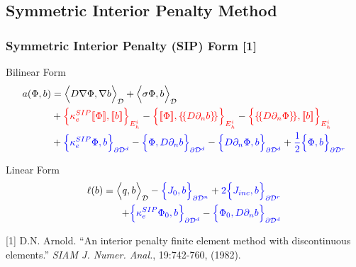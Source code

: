 \documentclass[compress,10pt]{beamer}
\renewcommand{\vec}[1]{\mathbf{#1}}
\newcommand{\tcr}[1]{\textcolor{red}{#1}}
\newcommand{\tcb}[1]{\textcolor{blue}{#1}}
\begin{document}
\subsection{Symmetric Interior Penalty Method}
\begin{frame}[t]\frametitle{Symmetric Interior Penalty (SIP) Form [1]}
\begin{block}{Bilinear Form}{\small
\begin{equation*}
\begin{aligned}
a( \Phi, b)  &= \Big<  D \vec{\nabla}  \Phi , \vec{\nabla} b  \Big>_{\mathcal{D}} + \Big<  \sigma   \Phi ,  b  \Big>_{\mathcal{D}}    \\
&+  \tcr{\Big\{ \kappa_e^{SIP} [\![   \Phi ]\!] , [\![  b ]\!]\Big\}_{E_h^i}} - \tcr{\Big\{  [\![   \Phi ]\!] , \{\!\{  D \partial_n b \}\!\}\Big\}_{E_h^i}} -\tcr{\Big\{ \{\!\{  D \partial_n  \Phi \}\!\} , [\![ b ]\!]\Big\}_{E_h^i}} \\
&+ \tcb{\Big\{ \kappa_e^{SIP}   \Phi ,   b \Big\}_{\partial \mathcal{D}^d}} - \tcb{\Big\{   \Phi  ,  D \partial_n b \Big\}_{\partial \mathcal{D}^d}} - \tcb{\Big\{   D \partial_n  \Phi ,   b \Big\}_{\partial \mathcal{D}^d}}  +  \tcb{\frac{1}{2} \Big\{    \Phi ,   b \Big\}_{\partial \mathcal{D}^r}}
\end{aligned}
\end{equation*} }
\end{block}
\begin{block}{Linear Form}{\small
\begin{align*}
\ell (b) = \Big<  q, b  \Big>_{\mathcal{D}}  - \tcb{\Big\{   J_{0}, b  \Big\}_{\partial \mathcal{D}^n}} +  \tcb{2 \Big\{   J_{inc}, b  \Big\}_{\partial \mathcal{D}^r}} \\ + \tcb{\Big\{ \kappa_e^{SIP}   \Phi_0 ,   b \Big\}_{\partial \mathcal{D}^d}} - \tcb{\Big\{   \Phi_0  ,  D \partial_n b \Big\}_{\partial \mathcal{D}^d} }
\end{align*} }
\end{block}
\begin{block}{}{\footnotesize
[1] D.N. Arnold. ``An interior penalty finite element method with discontinuous elements.'' {\em SIAM J. Numer. Anal.}, 19:742-760, (1982).
}\end{block}
\end{frame}
\end{document}
